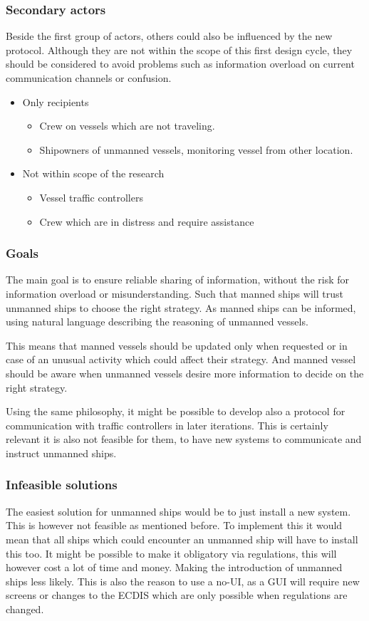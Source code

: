 \subsubsection{Secondary actors}
Beside the first group of actors, others could also be influenced by the new protocol. Although they are not within the scope of this first design cycle, they should be considered to avoid problems such as information overload on current communication channels or confusion. 
\begin{itemize}
	\item Only recipients
	\begin{itemize}
		\item Crew on vessels which are not traveling.
		\item Shipowners of unmanned vessels, monitoring vessel from other location.
	\end{itemize}
	\item Not within scope of the research
	\begin{itemize}
		\item Vessel traffic controllers
		\item Crew which are in distress and require assistance
	\end{itemize}
\end{itemize}

\subsubsection{Goals}
The main goal is to ensure reliable sharing of information, without the risk for information overload or misunderstanding. Such that manned ships will trust unmanned ships to choose the right strategy. As manned ships can be informed, using natural language describing the reasoning of unmanned vessels.

This means that manned vessels should be updated only when requested or in case of an unusual activity which could affect their strategy. And manned vessel should be aware when unmanned vessels desire more information to decide on the right strategy.

Using the same philosophy, it might be possible to develop also a protocol for communication with traffic controllers in later iterations. This is certainly relevant it is also not feasible for them, to have new systems to communicate and instruct unmanned ships.

\subsubsection{Infeasible solutions}
The easiest solution for unmanned ships would be to just install a new system. This is however not feasible as mentioned before. To implement this it would mean that all ships which could encounter an unmanned ship will have to install this too. It might be possible to make it obligatory via regulations, this will however cost a lot of time and money. Making the introduction of unmanned ships less likely.
This is also the reason to use a \ac{no-UI}, as a GUI will require new screens or changes to the \ac{ECDIS} which are only possible when regulations are changed.

